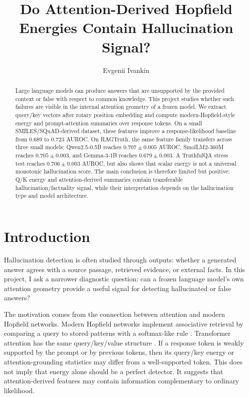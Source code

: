 \documentclass{article}
\title{Do Attention-Derived Hopfield Energies Contain Hallucination Signal?}
\author{%
  Evgenii Ivankin
}
\begin{document}
\maketitle

\begin{abstract}
Large language models can produce answers that are unsupported by the provided context or false
with respect to common knowledge. This project studies whether such failures are visible in the
internal attention geometry of a frozen model. We extract query/key vectors after rotary position
embedding and compute modern-Hopfield-style energy and prompt-attention summaries over response
tokens. On a small SMILES/SQuAD-derived dataset, these features improve a response-likelihood
baseline from $0.689$ to $0.723$ AUROC. On RAGTruth, the same feature family transfers across
three small models: Qwen2.5-0.5B reaches $0.707 \pm 0.005$ AUROC, SmolLM2-360M reaches
$0.705 \pm 0.003$, and Gemma-3-1B reaches $0.679 \pm 0.003$. A TruthfulQA stress test reaches
$0.706 \pm 0.003$ AUROC, but also shows that scalar energy is not a universal monotonic
hallucination score. The main conclusion is therefore limited but positive: Q/K energy and
attention-derived summaries contain transferable hallucination/factuality signal, while their
interpretation depends on the hallucination type and model architecture.
\end{abstract}

\section{Introduction}

Hallucination detection is often studied through outputs: whether a generated answer agrees with a
source passage, retrieved evidence, or external facts. In this project, I ask a narrower diagnostic
question: can a frozen language model's own attention geometry provide a useful signal for detecting
hallucinated or false answers?

The motivation comes from the connection between attention and modern Hopfield networks. Modern
Hopfield networks implement associative retrieval by comparing a query to stored patterns with a
softmax-like rule \citep{ramsauer2021hopfield}. Transformer attention has the same query/key/value
structure \citep{vaswani2017attention}. If a response token is weakly supported by the prompt or by
previous tokens, then its query/key energy or attention-grounding statistics may differ from a
well-supported token. This does not imply that energy alone should be a perfect detector. It suggests
that attention-derived features may contain information complementary to ordinary likelihood.
\end{document}
